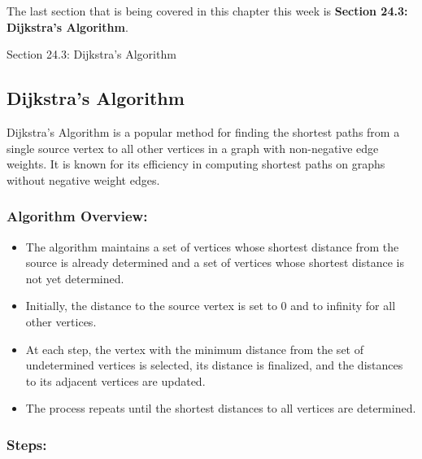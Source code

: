 The last section that is being covered in this chapter this week is \textbf{Section 24.3: Dijkstra's Algorithm}.

\begin{notes}{Section 24.3: Dijkstra's Algorithm}
    \subsection*{Dijkstra's Algorithm}

    Dijkstra's Algorithm is a popular method for finding the shortest paths from a single source vertex to all other vertices in a graph with non-negative edge weights. It is known for its efficiency 
    in computing shortest paths on graphs without negative weight edges. \vspace*{1em}
    
    \subsubsection*{Algorithm Overview:}
    
    \begin{itemize}
        \item The algorithm maintains a set of vertices whose shortest distance from the source is already determined and a set of vertices whose shortest distance is not yet determined.
        \item Initially, the distance to the source vertex is set to 0 and to infinity for all other vertices.
        \item At each step, the vertex with the minimum distance from the set of undetermined vertices is selected, its distance is finalized, and the distances to its adjacent vertices are updated.
        \item The process repeats until the shortest distances to all vertices are determined.
    \end{itemize}
    
    \subsubsection*{Steps:}
    

\end{notes}
